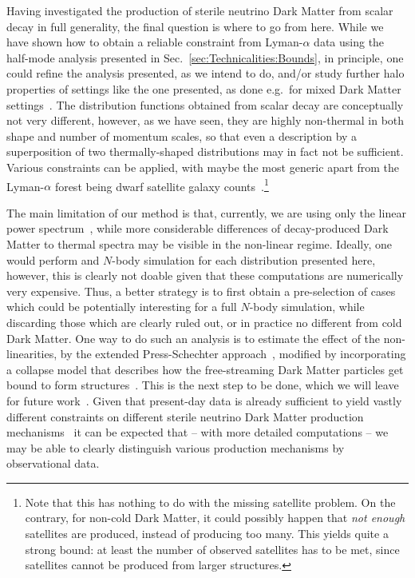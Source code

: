 Having investigated the production of sterile neutrino Dark Matter from scalar decay in full generality, the final question is where to go from here. While we have shown how to obtain a reliable constraint from Lyman-$\alpha$ data using the half-mode analysis presented in Sec.~\ref{sec:Technicalities:Bounds}, in principle, one could refine the analysis presented, as we intend to do, and/or study further halo properties of settings like the one presented, as done e.g.\ for mixed Dark Matter settings~\cite{Maccio:2012uh,Anderhalden:2012jc}. The distribution functions obtained from scalar decay are conceptually not very different, however, as we have seen, they are highly non-thermal in both shape and number of momentum scales, so that even a description by a superposition of two thermally-shaped distributions may in fact not be sufficient. Various constraints can be applied, with maybe the most generic apart from the Lyman-$\alpha$ forest being dwarf satellite galaxy counts~\cite{Schneider:2014rda}.\footnote{Note that this has nothing to do with the missing satellite problem. On the contrary, for non-cold Dark Matter, it could possibly happen that \emph{not enough} satellites are produced, instead of producing too many. This yields quite a strong bound: at least the number of observed satellites has to be met, since satellites cannot be produced from larger structures.}

The main limitation of our method is that, currently, we are using only the linear power spectrum~\cite{Ma:1995ey}, while more considerable differences of decay-produced Dark Matter to thermal spectra may be visible in the non-linear regime. Ideally, one would perform and $N$-body simulation for each distribution presented here, however, this is clearly not doable given that these computations are numerically very expensive. Thus, a better strategy is to first obtain a pre-selection of cases which could be potentially interesting for a full $N$-body simulation, while discarding those which are clearly ruled out, or in practice no different from cold Dark Matter. One way to do such an analysis is to estimate the effect of the non-linearities, by the extended Press-Schechter approach~\cite{Press:1973iz,Sheth:1999mn}, modified by incorporating a collapse model that describes how the free-streaming Dark Matter particles get bound to form structures~\cite{Schneider:2013ria,Schneider:2014rda}. This is the next step to be done, which we will leave for future work~\cite{MenciSchneiderViel}. Given that present-day data is already sufficient to yield vastly different constraints on different sterile neutrino Dark Matter production mechanisms~\cite{Merle:2014xpa} it can be expected that -- with more detailed computations -- we may be able to clearly distinguish various production mechanisms by observational data.
